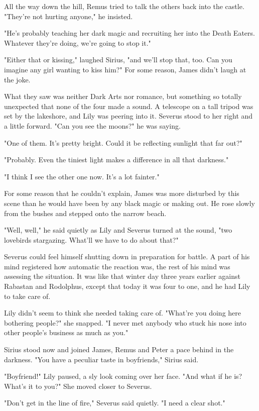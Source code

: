 \documentclass[a4paper,11pt]{article}
\begin{document}
All the way down the hill, Remus tried to talk the others back into the castle. "They're not hurting anyone," he insisted.

"He's probably teaching her dark magic and recruiting her into the Death Eaters. Whatever they're doing, we're going to stop it."

"Either that or kissing," laughed Sirius, "and we'll stop that, too. Can you imagine any girl wanting to kiss him?" For some reason, James didn't laugh at the joke.

What they saw was neither Dark Arts nor romance, but something so totally unexpected that none of the four made a sound. A telescope on a tall tripod was set by the lakeshore, and Lily was peering into it. Severus stood to her right and a little forward. "Can you see the moons?" he was saying.

"One of them. It's pretty bright. Could it be reflecting sunlight that far out?"

"Probably. Even the tiniest light makes a difference in all that darkness."

"I think I see the other one now. It's a lot fainter."

For some reason that he couldn't explain, James was more disturbed by this scene than he would have been by any black magic or making out. He rose slowly from the bushes and stepped onto the narrow beach.

"Well, well," he said quietly as Lily and Severus turned at the sound, "two lovebirds stargazing. What'll we have to do about that?"

Severus could feel himself shutting down in preparation for battle. A part of his mind registered how automatic the reaction was, the rest of his mind was assessing the situation. It was like that winter day three years earlier against Rabastan and Rodolphus, except that today it was four to one, and he had Lily to take care of.

Lily didn't seem to think she needed taking care of. "What're you doing here bothering people?" she snapped. "I never met anybody who stuck his nose into other people's business as much as you."

Sirius stood now and joined James, Remus and Peter a pace behind in the darkness. "You have a peculiar taste in boyfriends," Sirius said.

"Boyfriend!" Lily paused, a sly look coming over her face. "And what if he is? What's it to you?" She moved closer to Severus.

"Don't get in the line of fire," Severus said quietly. "I need a clear shot."
\end{document}
